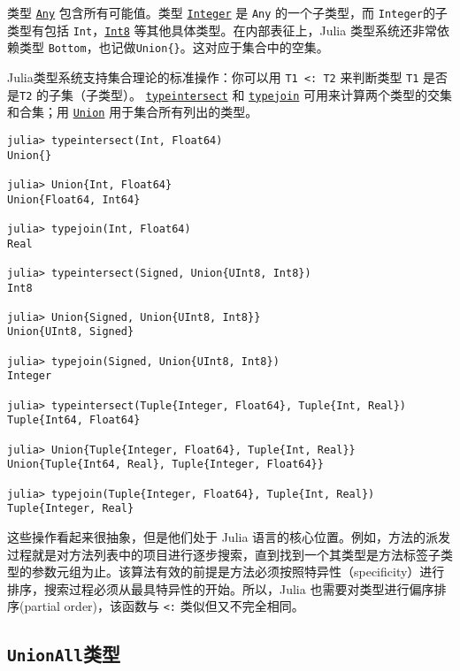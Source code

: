 类型 \hyperlink{15014186392807667022}{\texttt{Any}} 包含所有可能值。类型 \hyperlink{8469131683393450448}{\texttt{Integer}} 是 \texttt{Any} 的一个子类型，而 \texttt{Integer}的子类型有包括 \texttt{Int}，\hyperlink{5857518405103968275}{\texttt{Int8}} 等其他具体类型。在内部表征上，Julia 类型系统还非常依赖类型 \texttt{Bottom}，也记做\texttt{Union\{\}}。这对应于集合中的空集。



Julia类型系统支持集合理论的标准操作：你可以用 \texttt{T1 <: T2} 来判断类型 \texttt{T1} 是否是\texttt{T2} 的子集（子类型）。 \hyperlink{1869272868531275554}{\texttt{typeintersect}} 和 \hyperlink{6895589781245489183}{\texttt{typejoin}} 可用来计算两个类型的交集和合集；用 \hyperlink{5087820771052303592}{\texttt{Union}} 用于集合所有列出的类型。




\begin{verbatim}
julia> typeintersect(Int, Float64)
Union{}

julia> Union{Int, Float64}
Union{Float64, Int64}

julia> typejoin(Int, Float64)
Real

julia> typeintersect(Signed, Union{UInt8, Int8})
Int8

julia> Union{Signed, Union{UInt8, Int8}}
Union{UInt8, Signed}

julia> typejoin(Signed, Union{UInt8, Int8})
Integer

julia> typeintersect(Tuple{Integer, Float64}, Tuple{Int, Real})
Tuple{Int64, Float64}

julia> Union{Tuple{Integer, Float64}, Tuple{Int, Real}}
Union{Tuple{Int64, Real}, Tuple{Integer, Float64}}

julia> typejoin(Tuple{Integer, Float64}, Tuple{Int, Real})
Tuple{Integer, Real}
\end{verbatim}



这些操作看起来很抽象，但是他们处于 Julia 语言的核心位置。例如，方法的派发过程就是对方法列表中的项目进行逐步搜索，直到找到一个其类型是方法标签子类型的参数元组为止。该算法有效的前提是方法必须按照特异性（specificity）进行排序，搜索过程必须从最具特异性的开始。所以，Julia 也需要对类型进行偏序排序(partial order)，该函数与 \texttt{<:} 类似但又不完全相同。



\hypertarget{7112415101914947726}{}


\subsection{\texttt{UnionAll}类型}



